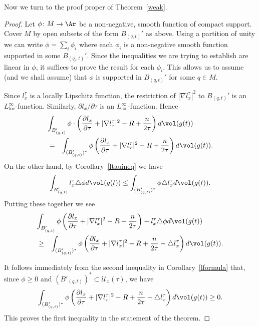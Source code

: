 Now we turn to the proof proper of Theorem~\ref{weak}.

\begin{proof}
Let $\phi\colon M\to \Ar$ be a non-negative, smooth function of
compact support. Cover $M$ by open subsets of the form $B_{(q,t)}'$
as above. Using a partition of unity we can write
$\phi=\sum_i\phi_i$ where each $\phi_i$ is a non-negative smooth
function supported in some $B_{(q_i,t)}'$. Since the inequalities we
are trying to establish are linear in $\phi$, it suffices to prove
the result for each $\phi_i$. This allows us to assume (and we shall
assume) that $\phi$ is supported in $B_{(q,t)}'$ for some $q\in M$.

Since $l_x^\tau$ is a locally Lipschitz function, the restriction of
$|\nabla l_x^\tau|^2$ to $B_{(q,t)}'$ is an $L_\mathrm{loc}^\infty$-function. Similarly, $\partial l_x/\partial \tau$ is an
$L_\mathrm{loc}^\infty$-function. Hence
\begin{eqnarray*} \lefteqn{\int_{B_{(q,t)}'}
\phi\cdot\left(\frac{\partial l_x}{\partial \tau}+|\nabla
l_x^\tau|^2-R+\frac{n}{2\tau}\right) d\vol(g(t))} \\ & = &
\int_{(B_{(q,t)}')^*}\phi\left(\frac{\partial l_x}{\partial
\tau}+|\nabla l_x^\tau|^2-R+\frac{n}{2\tau}\right) d\vol(g(t)).\end{eqnarray*} On the other hand, by
Corollary~\ref{ltauineq} we have
$$\int_{B_{(q,t)}'}l_x^\tau\triangle \phi  d\vol(g(t))\le \int_{(B_{(q,t)}')^*}\phi\triangle l_x^\tau
d\vol(g(t)).$$ Putting these together we see
\begin{eqnarray*}
\lefteqn{\int_{B_{(q,t)}'}\phi\left(\frac{\partial l_x}{\partial
\tau}+|\nabla
l_x^\tau|^2-R+\frac{n}{2\tau}\right) -l_x^\tau\triangle \phi  d\vol(g(t))} \\
& \ge & \int_{(B_{(q,t)}')^*}\phi\left(\frac{\partial l_x}{\partial
\tau}+|\nabla l_x^\tau|^2-R+\frac{n}{2\tau} -\triangle
l_x^\tau\right) d\vol(g(t)).\end{eqnarray*}

It follows immediately from the second inequality in
Corollary~\ref{lformula} that, since $\phi\ge 0$ and
$\left(B'_{(q,t)}\right)^*\subset {\mathcal U}_x(\tau)$, we have
$$\int_{(B_{(q,t)}')^*}\phi\left(\frac{\partial l_x}{\partial \tau}+|\nabla l_x^\tau|^2-R+
\frac{n}{2\tau}-\triangle l_x^\tau\right) d\vol(g(t))\ge 0.$$
This proves the first inequality in the statement of the theorem.


\end{proof}
